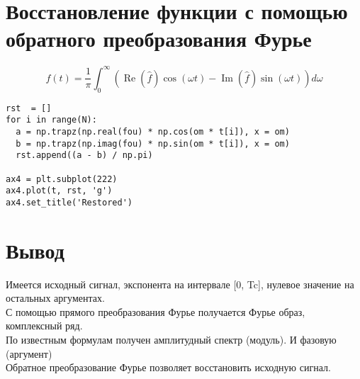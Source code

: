 \documentclass[12pt]{article}
\begin{document}
\section{Восстановление функции с помощью обратного преобразования Фурье}

\[f(t) = \frac{1}{\pi} \int_{0}^{\infty}(\operatorname{Re}(\hat{f})\cos(\omega t) - \operatorname{Im}(\hat{f})\sin(\omega t))d\omega \]

\begin{lstlisting}
rst  = []
for i in range(N):
  a = np.trapz(np.real(fou) * np.cos(om * t[i]), x = om)
  b = np.trapz(np.imag(fou) * np.sin(om * t[i]), x = om)
  rst.append((a - b) / np.pi)

ax4 = plt.subplot(222)
ax4.plot(t, rst, 'g')
ax4.set_title('Restored')
\end{lstlisting}


\section{Вывод}
Имеется исходный сигнал, экспонента на интервале [0, Tc], нулевое значение на остальных аргументах.\\
С помощью прямого преобразования Фурье получается Фурье образ, комплексный ряд.\\
По известным формулам получен амплитудный спектр (модуль). И фазовую (аргумент)\\
Обратное преобразование Фурье позволяет восстановить исходную сигнал.
\end{document}
